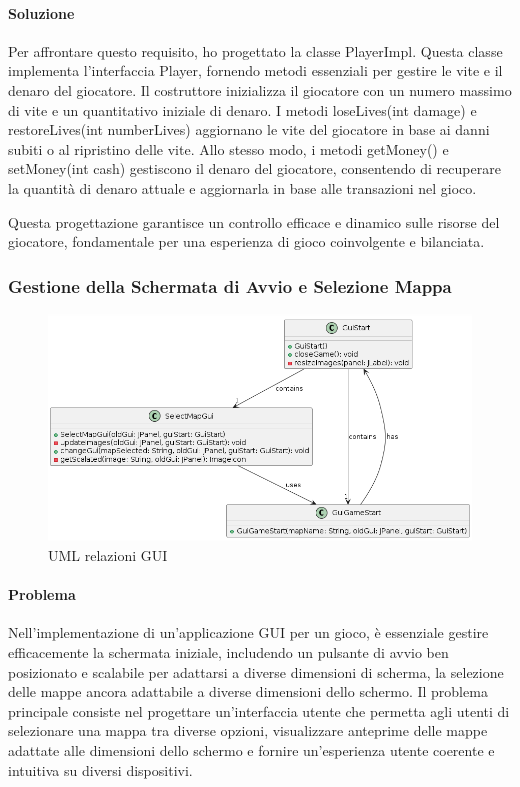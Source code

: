 \documentclass[a4paper,12pt]{report}
\begin{document}
\paragraph{Soluzione} Per affrontare questo requisito, ho progettato la classe PlayerImpl. Questa classe implementa l'interfaccia Player, fornendo metodi essenziali per gestire le vite e il denaro del giocatore. Il costruttore inizializza il giocatore con un numero massimo di vite e un quantitativo iniziale di denaro. I metodi loseLives(int damage) e restoreLives(int numberLives) aggiornano le vite del giocatore in base ai danni subiti o al ripristino delle vite. Allo stesso modo, i metodi getMoney() e setMoney(int cash) gestiscono il denaro del giocatore, consentendo di recuperare la quantità di denaro attuale e aggiornarla in base alle transazioni nel gioco.

Questa progettazione garantisce un controllo efficace e dinamico sulle risorse del giocatore, fondamentale per una esperienza di gioco coinvolgente e bilanciata.

\subsubsection{Gestione della Schermata di Avvio e Selezione Mappa}

\begin{figure}[H]
    \centering
    \includegraphics[scale=0.8]{Gui}
    \caption{UML relazioni GUI}
    \label{fig:gui}
\end{figure}

\paragraph{Problema} Nell'implementazione di un'applicazione GUI per un gioco, è essenziale gestire efficacemente la schermata iniziale, includendo un pulsante di avvio ben posizionato e scalabile per adattarsi a diverse dimensioni di scherma, la selezione delle mappe ancora adattabile a diverse dimensioni dello schermo. Il problema principale consiste nel progettare un'interfaccia utente che permetta agli utenti di selezionare una mappa tra diverse opzioni, visualizzare anteprime delle mappe adattate alle dimensioni dello schermo e fornire un'esperienza utente coerente e intuitiva su diversi dispositivi.
\end{document}
